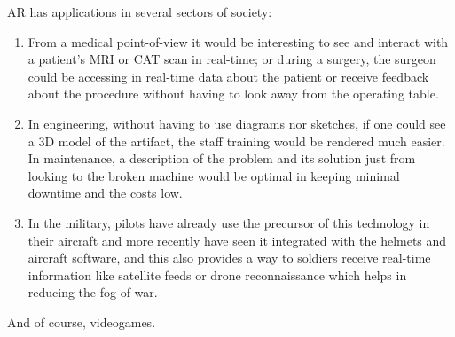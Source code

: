 \documentclass[runningheads]{llncs}
\begin{document}
\par AR has applications in several sectors of society:
\begin{enumerate}
    \item From a medical point-of-view it would be interesting to see and interact with a patient's MRI or CAT scan in real-time; or during a surgery, the surgeon could be accessing in real-time data about the patient or receive feedback about the procedure without having to look away from the operating table.
    \item In engineering, without having to use diagrams nor sketches, if one could see a 3D model of the artifact, the staff training would be rendered much easier. In maintenance, a description of the problem and its solution just from looking to the broken machine would be optimal in keeping minimal downtime and the costs low. 
    \item In the military, pilots have already use the precursor of this technology in their aircraft and more recently have seen it integrated with the helmets and aircraft software, and this also provides a way to soldiers receive real-time information like satellite feeds or drone reconnaissance which helps in reducing the fog-of-war.
\end{enumerate}
And of course, videogames.
\end{document}
